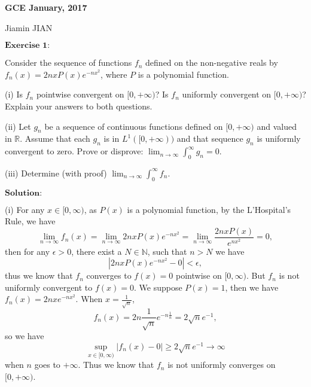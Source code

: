 \documentclass[12pt,a4paper]{ctexart}
\begin{document}
\begin{center}
\textbf{ GCE January, 2017}
\vspace{8pt}

Jiamin JIAN
\end{center}

\vspace{12pt}

$\textbf{Exercise 1:}$

Consider the sequence of functions $f_{n}$ defined on the non-negative reals by $f_{n} (x) = 2 n x P(x) e^{-n x^{2}}$, where $P$ is a polynomial function.

(i) Is $f_{n}$ pointwise convergent on $[0, + \infty)$? Is $f_{n}$ uniformly convergent on $[0, + \infty)$? Explain your answers to both questions.

(ii) Let $g_{n}$ be a sequence of continuous functions defined on $[0, + \infty)$ and valued in $\mathbb{R}$. Assume that each $g_{n}$ is in $L^{1}([0, + \infty))$ and that sequence $g_{n}$ is uniformly convergent to zero. Prove or disprove: $\lim_{n \to \infty} \int_{0}^{\infty} g_{n} = 0$. 

(iii) Determine (with proof) $\lim_{n \to \infty} \int_{0}^{\infty}  f_{n}$.
  
\vspace{8pt}

$\textbf{Solution:}$

(i) For any $x \in [0, \infty)$, as $P(x)$ is a polynomial function, by the L'Hospital's Rule, we have
\begin{equation*}
    \lim_{n \to \infty} f_{n} (x) = \lim_{n \to \infty} 2 n x P(x) e^{-n x^{2}} = \lim_{n \to \infty} \frac{2 n x P(x)}{e^{n x^{2}}} = 0,
\end{equation*}
then for any $\epsilon > 0$, there exist a $N \in \mathbb{N}$, such that $n > N$ we have 
\begin{equation*}
    |2 n x P(x) e^{- n x^{2}} - 0| < \epsilon,
\end{equation*}
thus we know that $f_{n}$ converges to $f(x) = 0$ pointwise on $[0, \infty)$. But $f_{n}$ is not uniformly convergent to $f(x) = 0$. We suppose $P(x) = 1$, then we have $f_{n}(x) = 2 n x e^{-n x^{2}} $. When $x = \frac{1}{\sqrt{n}}$, 
\begin{equation*}
    f_{n} (x) = 2 n \frac{1}{\sqrt{n}} e^{- n \frac{1}{n}} = 2 \sqrt{n} e^{-1},
\end{equation*}
so we have
\begin{equation*}
    \sup_{x \in [0, \infty)} |f_{n} (x) - 0| \geq 2 \sqrt{n} e^{-1} \to \infty
\end{equation*}
when $n$ goes to $+ \infty$. Thus we know that $f_{n}$ is not uniformly converges on $[0, + \infty)$. 
\end{document}
